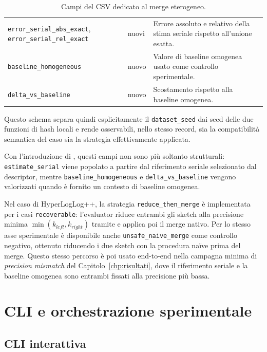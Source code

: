 \begin{table}[h]
\begin{tabular}{p{} p{} p{}}
\texttt{error\_serial\_abs\_exact}, \texttt{error\_serial\_rel\_exact} & nuovi & Errore assoluto e relativo della stima seriale rispetto all'unione esatta. \\
\texttt{baseline\_homogeneous} & nuovo & Valore di baseline omogenea usato come controllo sperimentale. \\
\texttt{delta\_vs\_baseline} & nuovo & Scostamento rispetto alla baseline omogenea. \\
\bottomrule
\end{tabular}
\caption{Campi del CSV dedicato al merge eterogeneo.}
\label{tab:heterogeneous-merge-header}
\end{table}

Questo schema separa quindi esplicitamente il \texttt{dataset\_seed} dai seed
delle due funzioni di hash locali e rende osservabili, nello stesso record, sia
la compatibilità semantica del caso sia la strategia effettivamente applicata.

Con l'introduzione di , questi campi
non sono più soltanto strutturali: \texttt{estimate\_serial} viene popolato a
partire dal riferimento seriale selezionato dal descriptor, mentre
\texttt{baseline\_homogeneous} e \texttt{delta\_vs\_baseline} vengono valorizzati
quando è fornito un contesto di baseline omogenea.

Nel caso di HyperLogLog++, la strategia \texttt{reduce\_then\_merge} è
implementata per i casi \texttt{recoverable}: l'evaluator riduce entrambi gli
sketch alla precisione minima \(\min(k_{left}, k_{right})\) tramite
 e applica poi il merge nativo. Per lo stesso
asse sperimentale è disponibile anche \texttt{unsafe\_naive\_merge} come
controllo negativo, ottenuto riducendo i due sketch con la procedura naïve
 prima del merge.
Questo stesso percorso è poi usato end-to-end nella campagna minima di
\emph{precision mismatch} del Capitolo~\ref{chp:risultati}, dove il riferimento
seriale e la baseline omogenea sono entrambi fissati alla precisione più bassa.

\section{CLI e orchestrazione sperimentale}

\subsection{CLI interattiva}

